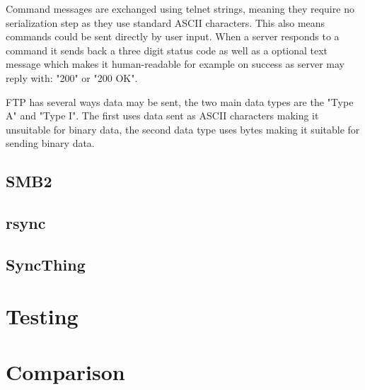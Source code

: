 Command messages are exchanged using telnet strings, meaning they require no serialization step as they use standard ASCII characters. This also means commands could be sent directly by user input. When a server responds to a command it sends back a three digit status code as well as a optional text message which makes it human-readable for example on success as server may reply with: "200" or "200 OK".

FTP has several ways data may be sent, the two main data types are the "Type A" and "Type I". The first uses data sent as ASCII characters making it unsuitable for binary data, the second data type uses bytes making it suitable for sending binary data.

\subsection*{SMB2}
\subsection*{rsync}
\subsection*{SyncThing}


\section{Testing}
\section{Comparison}
